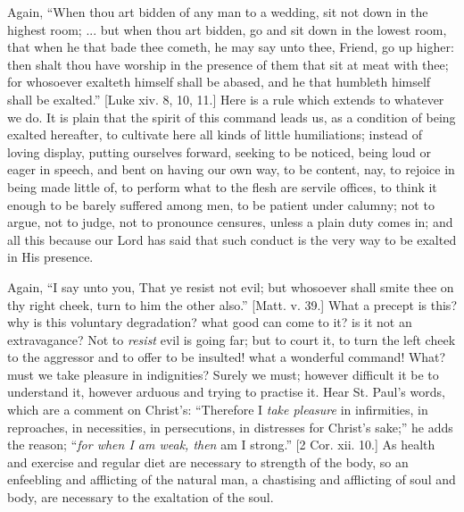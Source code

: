 Again, ``When thou art bidden of any man to a wedding, sit not
down in the highest room; ... but when thou art bidden, go and sit
down in the lowest room, that when he that bade thee cometh, he may
say unto thee, Friend, go up higher: then shalt thou have worship in
the presence of them that sit at meat with thee; for whosoever
exalteth himself shall be abased, and he that humbleth himself shall
be exalted.'' [Luke xiv. 8, 10, 11.] Here is a rule which extends
to whatever we do. It is plain that the spirit of this command leads
us, as a condition of being exalted hereafter, to cultivate here all
kinds of little humiliations; instead of loving display, putting
ourselves forward, seeking to be noticed, being loud or eager in
speech, and bent on having our own way, to be content, nay, to rejoice
in being made little of, to perform what to the flesh are servile
offices, to think it enough to be barely suffered among men, to be
patient under calumny; not to argue, not to judge, not to pronounce
censures, unless a plain duty comes in; and all this because our Lord
has said that such conduct is the very way to be exalted in His
presence.

Again, ``I say unto you, That ye resist not evil; but whosoever
shall smite thee on thy right cheek, turn to him the other also.''
[Matt. v. 39.] What a precept is this? why is this voluntary
degradation? what good can come to it? is it not an extravagance? Not
to \emph{resist} evil is going far; but to court it, to turn the left
cheek to the aggressor and to offer to be insulted! what a wonderful
command! What? must we take pleasure in indignities? Surely we must;
however difficult it be to understand it, however arduous and trying
to practise it. Hear St. Paul's words, which are a comment on
Christ's: ``Therefore I \emph{take pleasure} in infirmities, in
reproaches, in necessities, in persecutions, in distresses for
Christ's sake;'' he adds the reason; ``\emph{for when I am weak,
then} am I strong.'' [2 Cor. xii. 10.] As health and exercise
and regular diet are necessary to strength of the body, so an
enfeebling and afflicting of the natural man, a chastising and
afflicting of soul and body, are necessary to the exaltation of the
soul.

